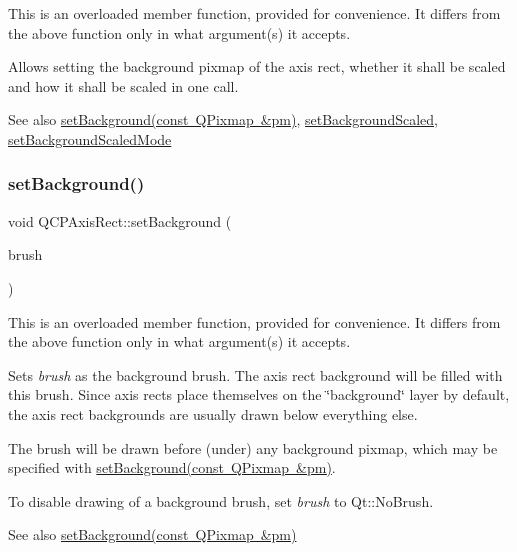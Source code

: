 This is an overloaded member function, provided for convenience. It differs from the above function only in what argument(s) it accepts.

Allows setting the background pixmap of the axis rect, whether it shall be scaled and how it shall be scaled in one call.

\begin{DoxySeeAlso}{See also}
\mbox{\hyperlink{class_q_c_p_axis_rect_af615ab5e52b8e0a9a0eff415b6559db5}{set\+Background(const Q\+Pixmap \&pm)}}, \mbox{\hyperlink{class_q_c_p_axis_rect_ae6d36c3e0e968ffb991170a018e7b503}{set\+Background\+Scaled}}, \mbox{\hyperlink{class_q_c_p_axis_rect_a5ef77ea829c9de7ba248e473f48f7305}{set\+Background\+Scaled\+Mode}} 
\end{DoxySeeAlso}
\mbox{\label{class_q_c_p_axis_rect_a22a22b8668735438dc06f9a55fe46b33}} 
\subsubsection{\texorpdfstring{set\+Background()}{setBackground()}\hspace{0.1cm}{\footnotesize\ttfamily [3/3]}}
{\footnotesize\ttfamily void Q\+C\+P\+Axis\+Rect\+::set\+Background (\begin{DoxyParamCaption}\item[{const Q\+Brush \&}]{brush }\end{DoxyParamCaption})}

This is an overloaded member function, provided for convenience. It differs from the above function only in what argument(s) it accepts.

Sets {\itshape brush} as the background brush. The axis rect background will be filled with this brush. Since axis rects place themselves on the \char`\"{}background\char`\"{} layer by default, the axis rect backgrounds are usually drawn below everything else.

The brush will be drawn before (under) any background pixmap, which may be specified with \mbox{\hyperlink{class_q_c_p_axis_rect_af615ab5e52b8e0a9a0eff415b6559db5}{set\+Background(const Q\+Pixmap \&pm)}}.

To disable drawing of a background brush, set {\itshape brush} to Qt\+::\+No\+Brush.

\begin{DoxySeeAlso}{See also}
\mbox{\hyperlink{class_q_c_p_axis_rect_af615ab5e52b8e0a9a0eff415b6559db5}{set\+Background(const Q\+Pixmap \&pm)}} 
\end{DoxySeeAlso}
\mbox{\label{class_q_c_p_axis_rect_ae6d36c3e0e968ffb991170a018e7b503}} 
